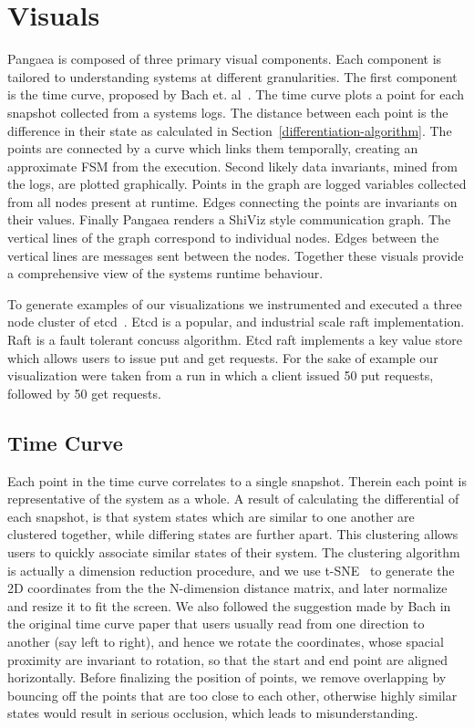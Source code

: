 \section{Visuals}
\label{sec:visuals}

Pangaea is composed of three primary visual components. Each component
is tailored to understanding systems at different granularities. The
first component is the time curve, proposed by Bach et.
al~\cite{Bach2015timecurves}.  The time curve plots a point for each
snapshot collected from a systems logs. The distance between each
point is the difference in their state as calculated in
Section~\ref{differentiation-algorithm}. The points are connected by a
curve which links them temporally, creating an approximate FSM from
the execution. Second likely data invariants, mined from the logs, are
plotted graphically. Points in the graph are logged variables
collected from all nodes present at runtime. Edges connecting the
points are invariants on their values. Finally Pangaea renders a
ShiViz style communication graph. The vertical lines of the graph
correspond to individual nodes. Edges between the vertical lines are
messages sent between the nodes. Together these visuals provide a
comprehensive view of the systems runtime behaviour.

To generate examples of our visualizations we instrumented and
executed a three node cluster of etcd~\cite{etcdraft}. Etcd is a
popular, and industrial scale raft implementation. Raft is a fault
tolerant concuss algorithm. Etcd raft implements a key value store
which allows users to issue put and get requests. For the sake of
example our visualization were taken from a run in which a client
issued 50 put requests, followed by 50 get requests.

\subsection{Time Curve}
\label{sec:time-curve}

Each point in the time curve correlates to a single snapshot.  Therein
each point is representative of the system as a whole.  A result of
calculating the differential of each snapshot, is that system states
which are similar to one another are clustered together, while
differing states are further apart.  This clustering allows users to
quickly associate similar states of their system. 
The clustering algorithm is actually a dimension reduction procedure,
and we use t-SNE~\cite{maaten2008visualizing} to generate the 2D 
coordinates from the the N-dimension distance matrix, and later 
normalize and resize it to fit the screen.  We also followed the 
suggestion made by Bach in the original time curve paper that 
users usually read from one direction to another (say left to right),
and hence we rotate the coordinates, whose spacial proximity
are invariant to rotation, so that the start and end point are
aligned horizontally.  Before finalizing the position of points,
we remove overlapping by bouncing off the points that are too close
to each other, otherwise highly similar states would result in
serious occlusion, which leads to misunderstanding.

